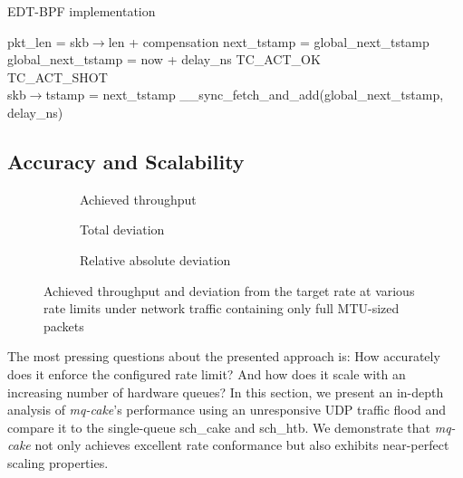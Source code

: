\begin{algorithm}[t]
    \caption{EDT-BPF implementation}\label{alg:edt-ebpf}
\begin{algorithmic}[1]
    \State pkt\_len = skb$\rightarrow$len + compensation
    \State next\_tstamp = global\_next\_tstamp
    \\
        \State global\_next\_tstamp = now + delay\_ns
        \State \Return TC\_ACT\_OK
    \EndIf
    \\
        \State \Return TC\_ACT\_SHOT
    \EndIf
    \\
    \State skb$\rightarrow$tstamp = next\_tstamp
    \State \_\_sync\_fetch\_and\_add(global\_next\_tstamp, delay\_ns)
\EndProcedure
\end{algorithmic}
\end{algorithm}

\subsection{Accuracy and Scalability}
\begin{figure*}
    \begin{subfigure}{0.3\linewidth}
        \centering
        
        \caption{Achieved throughput}\label{fig:tp_rate_conformance}
    \end{subfigure}
    \hfill
    \hspace{0.5cm}
    \begin{subfigure}{0.3\linewidth}
        \centering
        
        \caption{Total deviation}\label{fig:tp_deviation_total}
    \end{subfigure}
    \hfill
    \begin{subfigure}{0.3\linewidth}
        \centering
        
        \caption{Relative absolute deviation}\label{fig:tp_deviation_perc}
    \end{subfigure}
    \caption{Achieved throughput and deviation from the target rate at various rate limits under
    network traffic containing only full MTU-sized packets}\label{fig:accuracy}
\end{figure*}
The most pressing questions about the presented approach is: How accurately does it enforce the configured rate limit? And how does it scale with an increasing number of hardware queues?
In this section, we present an in-depth analysis of \textit{mq-cake}'s performance using an unresponsive UDP traffic flood and compare it to the single-queue sch\_cake and sch\_htb. 
We demonstrate that \textit{mq-cake} not only achieves excellent rate conformance but also exhibits near-perfect scaling properties.

